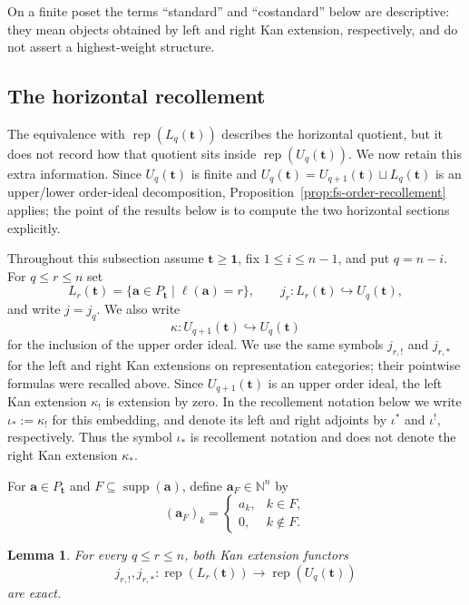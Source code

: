\documentclass[12pt,reqno]{amsart}
\newtheorem{lemma}[theorem]{Lemma}
\theoremstyle{definition}
\theoremstyle{remark}
\newcommand{\Rep}{\operatorname{rep}}
\begin{document}
On a finite poset the terms ``standard'' and ``costandard'' below are
descriptive: they mean objects obtained by left and right Kan extension,
respectively, and do not assert a highest-weight structure.

\subsection{The horizontal recollement}\label{subsec:horizontal-recollement}

The equivalence with $\Rep(L_q(\mathbf t))$ describes the horizontal quotient,
but it does not record how that quotient sits inside
$\Rep(U_q(\mathbf t))$.  We now retain this extra information.  Since
$U_q(\mathbf t)$ is finite and
$U_q(\mathbf t)=U_{q+1}(\mathbf t)\sqcup L_q(\mathbf t)$ is an upper/lower
order-ideal decomposition, Proposition~\ref{prop:fs-order-recollement}
applies; the point of the results below is to compute the two horizontal
sections explicitly.

Throughout this subsection assume $\mathbf t\ge\mathbf1$, fix
$1\le i\le n-1$, and put $q=n-i$.  For $q\le r\le n$ set
\[
L_r(\mathbf t)=\{\mathbf a\in P_{\mathbf t}\mid\ell(\mathbf a)=r\},
\qquad
j_r:L_r(\mathbf t)\hookrightarrow U_q(\mathbf t),
\]
and write $j=j_q$.  We also write
\[
\kappa:U_{q+1}(\mathbf t)\hookrightarrow U_q(\mathbf t)
\]
for the inclusion of the upper order ideal.  We use the same symbols
$j_{r,!}$ and $j_{r,*}$ for the left and right Kan extensions on
representation categories; their pointwise formulas were recalled above.
Since $U_{q+1}(\mathbf t)$ is an upper order ideal, the left Kan extension
$\kappa_!$ is extension by zero.  In the recollement notation below we write
$\iota_*:=\kappa_!$ for this embedding, and denote its left and right
adjoints by $\iota^*$ and $\iota^!$, respectively.  Thus the symbol
$\iota_*$ is recollement notation and does not denote the right Kan
extension $\kappa_*$.

For $\mathbf a\in P_{\mathbf t}$ and $F\subseteq\operatorname{supp}(\mathbf a)$, define $\mathbf a_F\in \mathbb N^n$ by
\[
(\mathbf a_F)_k=
\begin{cases}
a_k,&k\in F,\\
0,&k\notin F.
\end{cases}
\]

\begin{lemma}\label{lem:stratum-kan-exact}
For every $q\le r\le n$, both Kan extension functors
\[
j_{r,!},j_{r,*}:\Rep(L_r(\mathbf t))\longrightarrow\Rep(U_q(\mathbf t))
\]
are exact.
\end{lemma}
\end{document}
